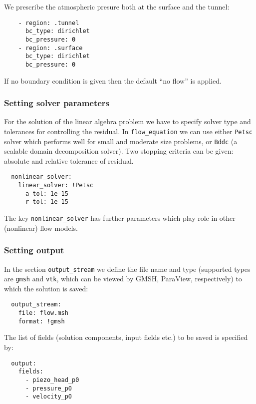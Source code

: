 We prescribe the atmospheric presure both at the surface and the tunnel:

\begin{verbatim}
    - region: .tunnel
      bc_type: dirichlet
      bc_pressure: 0
    - region: .surface
      bc_type: dirichlet
      bc_pressure: 0
\end{verbatim}

If no boundary condition is given then the default ``no flow'' is
applied.

\subsubsection{Setting solver parameters}

For the solution of the linear algebra problem we have to specify solver
type and tolerances for controlling the residual. In
\texttt{flow\_equation} we can use either \texttt{Petsc} solver which
performs well for small and moderate size problems, or \texttt{Bddc} (a
scalable domain decomposition solver). Two stopping criteria can be
given: absolute and relative tolerance of residual.

\begin{verbatim}
  nonlinear_solver:
    linear_solver: !Petsc
      a_tol: 1e-15
      r_tol: 1e-15
\end{verbatim}

The key \texttt{nonlinear\_solver} has further parameters which play
role in other (nonlinear) flow models.

\subsubsection{Setting output}

In the section \texttt{output\_stream} we define the file name and type
(supported types are \texttt{gmsh} and \texttt{vtk}, which can be viewed
by GMSH, ParaView, respectively) to which the solution is saved:

\begin{verbatim}
  output_stream:
    file: flow.msh
    format: !gmsh
\end{verbatim}

The list of fields (solution components, input fields etc.) to be saved
is specified by:

\begin{verbatim}
  output:
    fields:
      - piezo_head_p0
      - pressure_p0
      - velocity_p0
\end{verbatim}

